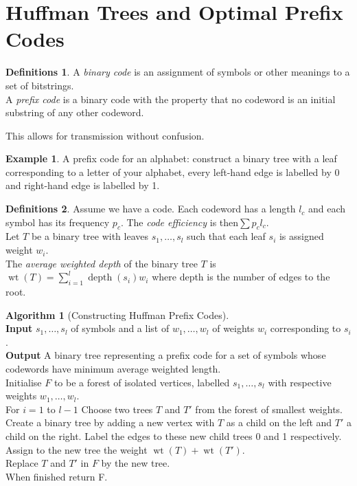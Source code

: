 \documentclass{article}
\theoremstyle{definition}
\newtheorem*{defns}{Definitions}
\newtheorem*{ex}{Example}
\newtheorem*{alg}{Algorithm}
\DeclareMathOperator{\wt}{wt}
\DeclareMathOperator{\depth}{depth}
\begin{document}
\section{Huffman Trees and Optimal Prefix Codes}

\begin{defns}
A \emph{binary code} is an assignment of symbols or other meanings to a set of bitstrings.\\
A \emph{prefix code} is a binary code with the property that no codeword is an initial substring of any other codeword.
\end{defns}

This allows for transmission without confusion.

\begin{ex}
A prefix code for an alphabet: construct a binary tree with a leaf corresponding to a letter of your alphabet, every left-hand edge is labelled by 0 and right-hand edge is labelled by 1.
\end{ex}


\begin{defns}
Assume we have a code.
Each codeword has a length $l_c$ and each symbol has its frequency $p_c$.
The \emph{code efficiency} is then$\sum p_cl_c$. \\
Let $T$ be a binary tree with leaves $s_1,\ldots,s_l$ such that each leaf $s_i$ is assigned weight $w_i$.\\
The \emph{average weighted depth} of the binary tree $T$ is $\wt(T) = \sum_{i=1}^l\depth(s_i)w_i$ where depth is the number of edges to the root.
\end{defns}

\begin{alg}[Constructing Huffman Prefix Codes]~\\
\textbf{Input} $s_1,\ldots,s_l$ of symbols and a list of $w_1,\ldots,w_l$ of weights $w_i$ corresponding to $s_i$.\\
\textbf{Output} A binary tree representing a prefix code for a set of symbols whose codewords have minimum average weighted length.\\
Initialise $F$ to be a forest of isolated vertices, labelled $s_1,\ldots,s_l$ with respective weights $w_1,\ldots, w_l$. \\
For $i=1$ to $l-1$ Choose two trees $T$ and $T'$ from the forest of smallest weights.\\
Create a binary tree by adding a new vertex with $T$ as a child on the left and $T'$ a child on the right. Label the edges to these new child trees 0 and 1 respectively. \\
Assign to the new tree the weight $\wt(T)+\wt(T')$. \\
Replace $T$ and $T'$ in $F$ by the new tree. \\
When finished return F.
\end{alg}
\end{document}
